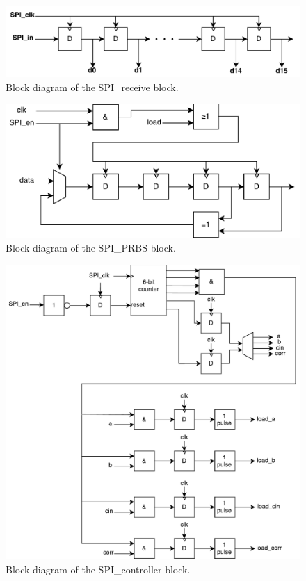 \begin{figure}[H]
	\centering
	\captionsetup{justification=centering}
	\includegraphics[scale=0.5]{../figures/SPI_receive.pdf}
	\caption{Block diagram of the SPI\_receive block.} \label{fig:spi_receive}
\end{figure}

\begin{figure}[H]
	\centering
	\captionsetup{justification=centering}
	\includegraphics[scale=0.5]{../figures/SPI_PRBS.pdf}
	\caption{Block diagram of the SPI\_PRBS block.} \label{fig:spi_prbs}
\end{figure}

\begin{figure}[H]
	\centering
	\captionsetup{justification=centering}
	\includegraphics[scale=0.5]{../figures/SPI_controller.pdf}
	\caption{Block diagram of the SPI\_controller block.} \label{fig:spi_controller}
\end{figure}

